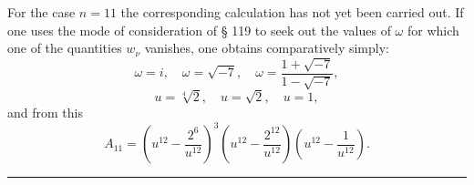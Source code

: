For the case $n = 11$ the corresponding calculation has not yet
been carried out. If one uses the mode of consideration of § 119 to
seek out the values of $\omega$ for which one of the quantities
$w_\nu$ vanishes, one obtains comparatively simply:
\[
\omega = i, \quad \omega = \sqrt{-7}, \quad \omega = \frac{1+\sqrt{-7}}{1-\sqrt{-7}},
\]
\[
u = \sqrt[4]{2}, \quad u = \sqrt{2}, \quad u = 1,
\]
and from this
\[
A_{11} = \left(u^{12} - \frac{2^6}{u^{12}}\right)^3\left(u^{12}-\frac{2^{12}}{u^{12}}\right)\left(u^{12}-\frac{1}{u^{12}}\right).
\]

\begin{center}\rule{3cm}{0.4pt}\end{center}
